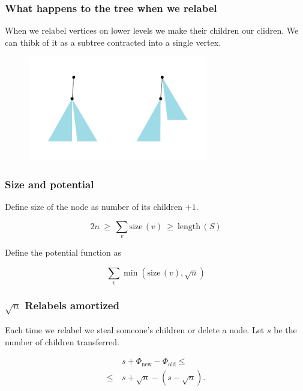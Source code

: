 \documentclass[aspectratio=1610,12pt,notheorems]{beamer}
\begin{document}
\begin{frame} \frametitle{What happens to the tree when we relabel} \vspace{1cm}

	When we relabel vertices on lower levels we make their children our clidren. We can thibk of it as a subtree contracted into a single vertex.

\begin{figure} \centering
	\includegraphics[width=0.7\textwidth]{algolunch/furtpush}
\end{figure}
\end{frame}

\begin{frame} \frametitle{Size and potential}
	Define size of the node as number of its children $+1$.

\begin{block}{\vspace*{-3ex}} \vspace{-1.8ex}
	$$2n\ \ge\ \sum\limits_v \mathrm{size}\, (v)\ \ge\ \mathrm{length}\, (S)$$ \vspace{-1ex}
\end{block}

Define the potential function as
\begin{block}{\vspace*{-3ex}} \vspace{-1.8ex}
	$$\sum\limits_v \min \left( \mathrm{size}\, (v), \sqrt{n} \right)$$ \vspace{-1ex}
\end{block}

\end{frame}

\begin{frame} \frametitle{$\sqrt{n}$ Relabels amortized}
Each time we relabel we steal someone's children or delete a node. Let $s$ be the number of children transferred.

\begin{align*}
	& s + \Phi_{\text{new}} - \Phi_{\text{old}} \le \\
\le\ 	& s + \sqrt{n} - (s - \sqrt{n}).
\end{align*}

\end{frame}
\end{document}
